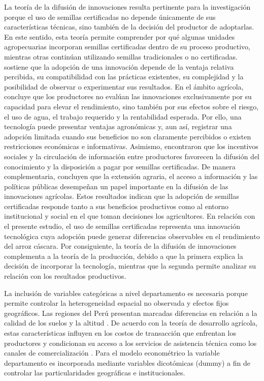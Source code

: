 \documentclass[11pt,a4paper,twocolumn]{article}
\begin{document}
La teoría de la difusión de innovaciones resulta pertinente para la investigación porque el uso de semillas certificadas no depende únicamente de sus características técnicas, sino también de la decisión del productor de adoptarlas. En este sentido, esta teoría permite comprender por qué algunas unidades agropecuarias incorporan semillas certificadas dentro de su proceso productivo, mientras otras continúan utilizando semillas tradicionales o no certificadas. \citet{rogers2003} sostiene que la adopción de una innovación depende de la ventaja relativa percibida, su compatibilidad con las prácticas existentes, su complejidad y la posibilidad de observar o experimentar sus resultados. En el ámbito agrícola, \citet{macours2019} concluye que los productores no evalúan las innovaciones exclusivamente por su capacidad para elevar el rendimiento, sino también por sus efectos sobre el riesgo, el uso de agua, el trabajo requerido y la rentabilidad esperada. Por ello, una tecnología puede presentar ventajas agronómicas y, aun así, registrar una adopción limitada cuando sus beneficios no son claramente percibidos o existen restricciones económicas e informativas. Asimismo, \citet{okello2023} encontraron que los incentivos sociales y la circulación de información entre productores favorecen la difusión del conocimiento y la disposición a pagar por semillas certificadas. De manera complementaria, \citet{elbakali2023} concluyen que la extensión agraria, el acceso a información y las políticas públicas desempeñan un papel importante en la difusión de las innovaciones agrícolas. Estos resultados indican que la adopción de semillas certificadas responde tanto a sus beneficios productivos como al entorno institucional y social en el que toman decisiones los agricultores. En relación con el presente estudio, el uso de semillas certificadas representa una innovación tecnológica cuya adopción puede generar diferencias observables en el rendimiento del arroz cáscara. Por consiguiente, la teoría de la difusión de innovaciones complementa a la teoría de la producción, debido a que la primera explica la decisión de incorporar la tecnología, mientras que la segunda permite analizar su relación con los resultados productivos.

La inclusión de variables categóricas a nivel departamento es necesaria porque permite controlar la heterogeneidad espacial no observada y efectos fijos geográficos. Las regiones del Perú presentan marcadas diferencias en relación a la calidad de los suelos y la altitud \citep{escobal2002}. De acuerdo con la teoría de desarrollo agrícola, estas características influyen en los costos de transacción que enfrentan los productores y condicionan su acceso a los servicios de asistencia técnica como los canales de comercialización \citep{key2000}. Para el modelo econométrico la variable departamento es incorporada mediante variables dicotómicas (dummy) a fin de controlar las particularidades geográficas e institucionales.
\end{document}
